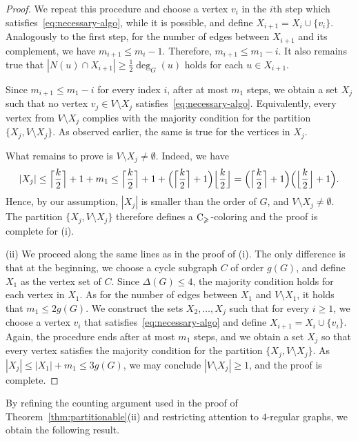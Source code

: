 \documentclass{article}
\theoremstyle{definition}
\newcommand{\cg}{{\rm C}_{\geqslant}}
\begin{document}
\begin{proof}
    We repeat this procedure and choose a vertex $v_i$ in the $i$th step which satisfies~\eqref{eq:necessary-algo}, while it is possible, and define $X_{i+1}=X_i \cup \{v_i\}$. Analogously to the first step, for the number of edges between $X_{i+1}$ and its complement, we have $m_{i+1} \leq m_i -1$. Therefore, $m_{i+1} \leq m_1 -i$. It also remains true that $|N(u) \cap X_{i+1}| \ge \frac{1}{2} \deg_G(u)$ holds for each $u \in X_{i+1}$. %

    Since $m_{i+1} \leq m_1 -i$ for every index $i$, after at most $m_1$ steps, we obtain a set $X_{j}$ such that no vertex $v_{j} \in V\setminus X_j$ satisfies~\eqref{eq:necessary-algo}. Equivalently, every vertex from $V \setminus X_j$ complies with the majority condition for the partition $\{X_j,V \setminus X_j\} $. As observed earlier, the same is true for the vertices in $X_j$.
    
    What remains to prove is $V \setminus X_j \neq \emptyset$. Indeed,  we have 
    $$|X_j| \leq \Bigl\lceil\frac{k}{2} \Bigr\rceil +1+m_1\leq \Bigl\lceil\frac{k}{2} \Bigr\rceil + 1 +  \Bigl(\Bigl\lceil\frac{k}{2} \Bigr\rceil+1 \Bigr)\Bigl\lfloor \frac{k}{2} \Bigr\rfloor
    =\Bigl(\Bigl\lceil\frac{k}{2} \Bigr\rceil+1 \Bigr) \Bigl(\Bigl\lfloor\frac{k}{2} \Bigr\rfloor+1 \Bigr).
    $$ 
Hence, by our assumption, $|X_j|$ is smaller than the order of $G$, and $V \setminus X_j \neq \emptyset$. 
The partition $\{X_j,V \setminus X_j\} $ therefore defines a $\cg$-coloring and the proof is complete for (i).
\medskip

(ii) We proceed along the same lines as in the proof of (i). The only difference is that at the beginning, we choose a cycle subgraph $C$ of order $g(G)$, and define $X_1$ as the vertex set of $C$. Since $\Delta(G) \leq 4$, the majority condition holds for each vertex in $X_1$. As for the number of edges between $X_1$ and $V \setminus X_1$, it holds that $m_1 \leq 2g(G)$. We construct the sets $X_2, \dots , X_j$ such that for every $i \ge 1$, we choose a vertex $v_{i}$ that satisfies~\eqref{eq:necessary-algo} and define $X_{i+1}= X_i \cup \{v_i\}$. Again, the procedure ends after at most $m_1$ steps, and we obtain a set $X_j$ so that every vertex satisfies the majority condition for the partition $\{X_j, V \setminus X_j\} $. As $|X_j| \leq |X_1| + m_1 \leq 3g(G) $, we may conclude $|V \setminus X_j| \ge 1$, and the proof is complete.
\end{proof}

By refining the counting argument used in the proof of Theorem~\ref{thm:partitionable}(ii) and restricting attention to $4$-regular graphs, we obtain the following result.
\end{document}
